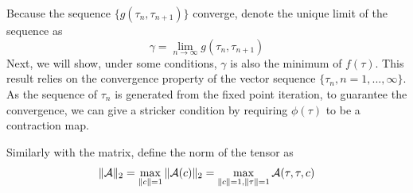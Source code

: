 \documentclass[aos,preprint]{imsart}
\theoremstyle{remark}
\begin{document}
Because the sequence $\{g(\tau_n,\tau_{n+1})\}$ converge, denote the unique limit of the sequence as
\[
\gamma = \lim_{n\rightarrow \infty} g(\tau_n,\tau_{n+1})
\]
Next, we will show, under some conditions, $\gamma$ is also the minimum of $f(\tau)$. This result relies on the convergence property of the vector sequence $\{\tau_n,n=1,...,\infty\}$. As the sequence of $\tau_n$ is generated from the fixed point iteration, to guarantee the convergence, we can give a stricker condition by requiring $\phi(\tau)$ to be a contraction map.

Similarly with the matrix, define the norm of the tensor as 
\[{
\|{\cal A}\|_2 = \max_{\|c\|=1}\|{\cal A}(c)\|_2=\max_{\|c\|=1,\|\tau\|=1} \cal A}(\tau,\tau,c)
\]
\end{document}
